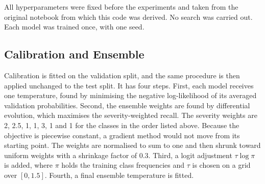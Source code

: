 \documentclass[10pt,twocolumn]{article}
\begin{document}
All hyperparameters were fixed before the experiments and taken from the original notebook from which this code was derived. No search was carried out. Each model was trained once, with one seed.

\begin{table}[t]
\centering
\footnotesize
\setlength{\tabcolsep}{3pt}
\caption{Training configuration per model. Clip values in parentheses apply to the unfreeze epoch (epoch 6) only. Stop (best ep.) is the last epoch run and the epoch with the highest validation macro-F1.}
\label{tab:config}
\end{table}

\subsection{Calibration and Ensemble}
Calibration is fitted on the validation split, and the same procedure is then applied unchanged to the test split. It has four steps. First, each model receives one temperature, found by minimising the negative log-likelihood of its averaged validation probabilities. Second, the ensemble weights are found by differential evolution, which maximises the severity-weighted recall. The severity weights are 2, 2.5, 1, 1, 3, 1 and 1 for the classes in the order listed above. Because the objective is piecewise constant, a gradient method would not move from its starting point. The weights are normalised to sum to one and then shrunk toward uniform weights with a shrinkage factor of 0.3. Third, a logit adjustment $\tau\log\pi$ is added, where $\pi$ holds the training class frequencies and $\tau$ is chosen on a grid over $[0,1.5]$. Fourth, a final ensemble temperature is fitted.
\end{document}
